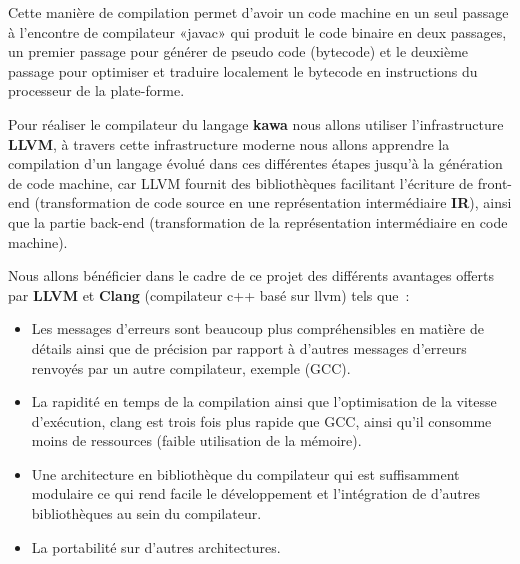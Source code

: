 \documentclass{../res/univ-projet}
\begin{document}
 Cette manière de compilation permet d'avoir un code machine en un seul passage à l'encontre de compilateur «javac» qui produit le code binaire en deux passages, un premier passage  pour générer de pseudo code (bytecode) et le deuxième passage  pour optimiser et traduire localement le bytecode en instructions du processeur de la plate-forme.

Pour réaliser le compilateur du langage \textbf {kawa} nous allons utiliser l'infrastructure \textbf {LLVM}, à travers cette infrastructure moderne nous allons apprendre la compilation d'un langage évolué dans ces différentes étapes jusqu'à la génération de code machine, car LLVM fournit des bibliothèques facilitant l’écriture de front-end (transformation de code source en une représentation intermédiaire \textbf {IR}), ainsi que la partie  back-end (transformation de la représentation intermédiaire en code machine).

Nous allons  bénéficier dans le cadre de ce projet des différents avantages offerts par \textbf {LLVM} et \textbf {Clang} (compilateur c++ basé sur llvm) tels que :
\begin{itemize}
\item Les messages d’erreurs sont beaucoup plus compréhensibles en matière de détails ainsi que de précision par rapport à d'autres messages d'erreurs renvoyés par un autre compilateur, exemple (GCC).
\item La rapidité en temps de la compilation ainsi que l'optimisation de la vitesse d'exécution, clang est trois fois plus rapide que GCC, ainsi qu'il consomme moins de ressources (faible utilisation de la mémoire).
\item Une architecture en bibliothèque du compilateur qui est suffisamment modulaire ce qui rend facile le développement et l'intégration de d'autres bibliothèques au sein du compilateur.
\item La portabilité sur d'autres architectures.
\end{itemize}

\end{document}
